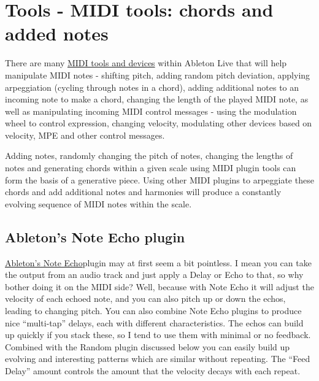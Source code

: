 \documentclass[
  12pt,
  letterpaper,
  oneside,
  open=any]{scrbook}
\begin{document}

\chapter{Tools - MIDI tools: chords and added
notes}\label{Chapter-004-Tools-MIDI_tools}

There are many
\href{https://www.ableton.com/en/live-manual/11/live-midi-effect-reference/\#live-midi-effect-reference}{MIDI
tools and devices} within Ableton Live that will help manipulate MIDI
notes - shifting pitch, adding random pitch deviation, applying
arpeggiation (cycling through notes in a chord), adding additional notes
to an incoming note to make a chord, changing the length of the played
MIDI note, as well as manipulating incoming MIDI control messages -
using the modulation wheel to control expression, changing velocity,
modulating other devices based on velocity, MPE and other control
messages.

\begin{tcolorbox}[enhanced jigsaw, colback=white, rightrule=.15mm, toprule=.15mm, arc=.35mm, opacitybacktitle=0.6, coltitle=black, leftrule=.75mm, bottomtitle=1mm, toptitle=1mm, left=2mm, bottomrule=.15mm, titlerule=0mm, colbacktitle=quarto-callout-tip-color!10!white, colframe=quarto-callout-tip-color-frame, title=\textcolor{quarto-callout-tip-color}{\faLightbulb}\hspace{0.5em}{Key idea}, breakable, opacityback=0]

Adding notes, randomly changing the pitch of notes, changing the lengths
of notes and generating chords within a given scale using MIDI plugin
tools can form the basis of a generative piece. Using other MIDI plugins
to arpeggiate these chords and add additional notes and harmonies will
produce a constantly evolving sequence of MIDI notes within the scale.

\end{tcolorbox}

\section{Ableton's Note Echo plugin}\label{abletons-note-echo-plugin}

\href{https://www.ableton.com/en/live-manual/11/max-for-live-devices/\#note-echo}{Ableton's
Note Echo}plugin may at first seem a bit pointless. I mean you can take
the output from an audio track and just apply a Delay or Echo to that,
so why bother doing it on the MIDI side? Well, because with Note Echo it
will adjust the velocity of each echoed note, and you can also pitch up
or down the echos, leading to changing pitch. You can also combine Note
Echo plugins to produce nice ``multi-tap'' delays, each with different
characteristics. The echos can build up quickly if you stack these, so I
tend to use them with minimal or no feedback. Combined with the Random
plugin discussed below you can easily build up evolving and interesting
patterns which are similar without repeating. The ``Feed Delay'' amount
controls the amount that the velocity decays with each repeat.
\end{document}
